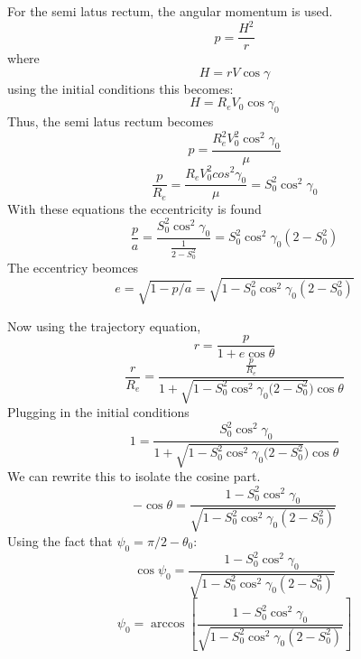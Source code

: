 For the semi latus rectum, the angular momentum is used.
\begin{equation}
p = \frac{H^2}{r}
\end{equation}
where
\begin{equation}
H = rV\cos\gamma
\end{equation}
using the initial conditions this becomes:
\begin{equation}
H = R_eV_0\cos\gamma_0
\end{equation}
Thus, the semi latus rectum becomes
\begin{equation}
p = \frac{R_e^2V_0^2\cos^2\gamma_0}{\mu}
\end{equation}
\begin{equation}
\frac{p}{R_e}=\frac{R_eV_0^2cos^2\gamma_0}{\mu}=S_0^2\cos^2\gamma_0
\end{equation}
With these equations the eccentricity is found
\begin{equation}
\frac{p}{a}=\frac{S_0^2\cos^2\gamma_0}{\frac{1}{2-S_0^2}}=S_0^2\cos^2\gamma_0(2-S_0^2)
\end{equation}
The eccentricy beomces
\begin{equation}
e = \sqrt{1-p/a}=\sqrt{1-S_0^2\cos^2\gamma_0(2-S_0^2)}
\end{equation}

Now using the trajectory equation, 
\begin{equation}
r = \frac{p}{1+e\cos\theta}
\end{equation}
\begin{equation}
\frac{r}{R_e}=\frac{\frac{p}{R_e}}{1+\sqrt{1-S_0^2\cos^2\gamma_0(2-S_0^2})\cos\theta}
\end{equation}
Plugging in the initial conditions 
\begin{equation}
1 = \frac{S_0^2\cos^2\gamma_0}{1+\sqrt{1-S_0^2\cos^2\gamma_0(2-S_0^2})\cos\theta}
\end{equation}
We can rewrite this to isolate the cosine part.
\begin{equation}
-\cos\theta = \frac{1-S_0^2\cos^2\gamma_0}{\sqrt{1-S_0^2\cos^2\gamma_0(2-S_0^2)}}
\end{equation}
Using the fact that $\psi_0 = \pi/2-\theta_0$:
\begin{equation}
\cos\psi_0=\frac{1-S_0^2\cos^2\gamma_0}{\sqrt{1-S_0^2\cos^2\gamma_0(2-S_0^2)}}
\end{equation}
\begin{equation}
\psi_0=\arccos[\frac{1-S_0^2\cos^2\gamma_0}{\sqrt{1-S_0^2\cos^2\gamma_0(2-S_0^2)}}]
\end{equation}

